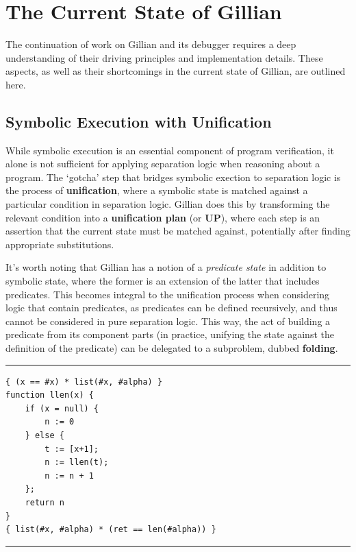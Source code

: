 
\chapter{The Current State of Gillian}\label{sec:current}

The continuation of work on Gillian and its debugger requires a deep
understanding of their driving principles and implementation details.
These aspects, as well as their shortcomings in the current state of Gillian,
are outlined here.

\section{Symbolic Execution with Unification}\label{sec:current:symex}


While symbolic execution is an essential component of program verification, it
alone is not sufficient for applying separation logic when reasoning about a
program. The `gotcha' step that bridges symbolic exection to separation logic is
the process of \textbf{unification}, where a symbolic state is matched against a
particular condition in separation logic. Gillian does this by transforming the
relevant condition into a \textbf{unification plan} (or \textbf{UP}), where each
step is an assertion that the current state must be matched against, potentially
after finding appropriate substitutions.

It's worth noting that Gillian has a notion of a \textit{predicate state} in
addition to symbolic state, where the former is an extension of the latter that
includes predicates. This becomes integral to the unification process when
considering logic that contain predicates, as predicates can be defined
recursively, and thus cannot be considered in pure separation logic. This way,
the act of building a predicate from its component parts (in practice, unifying
the state against the definition of the predicate) can be delegated to a
subproblem, dubbed \textbf{folding}.

\begin{listing}[!ht]
\noindent\rule{\textwidth}{0.5pt}
\vspace{-0.6cm}
\begin{verbatim}
{ (x == #x) * list(#x, #alpha) }
function llen(x) {
    if (x = null) {
        n := 0
    } else {
        t := [x+1];
        n := llen(t);
        n := n + 1
    };
    return n
}
{ list(#x, #alpha) * (ret == len(#alpha)) }
\end{verbatim}
\vspace{-0.4cm}
\noindent\rule{\textwidth}{0.5pt}
\vspace{-0.6cm}
\caption{The recursive list length function, in WISL}
\label{lst:llen-rec}
\end{listing}

